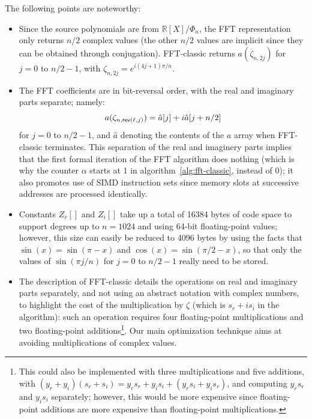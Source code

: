 \documentclass{llncs}
\newcommand{\bR}{\mathbb{R}}
\begin{document}
The following points are noteworthy:
\begin{itemize}

    \item Since the source polynomials are from $\bR[X]/\Phi_n$, the FFT
    representation only returns $n/2$ complex values (the other $n/2$
    values are implicit since they can be obtained through conjugation).
    \textsf{FFT-classic} returns $a(\zeta_{n,2j})$ for $j = 0$ to $n/2-1$,
    with $\zeta_{n,2j} = e^{i(4j+1)\pi/n}$.

    \item The FFT coefficients are in bit-reversal order, with the real
    and imaginary parts separate; namely:
    \begin{equation*}
        a(\zeta_{n,\text{\textsf{rev}}(\ell, j)})
            = {\hat a}[j] + i {\hat a}[j + n/2]
    \end{equation*}
    for $j = 0$ to $n/2 - 1$, and ${\hat a}$ denoting the contents of
    the $a$ array when \textsf{FFT-classic} terminates. This separation
    of the real and imaginery parts implies that the first formal
    iteration of the FFT algorithm does nothing (which is why the
    counter $\alpha$ starts at 1 in algorithm~\ref{alg:fft-classic},
    instead of 0); it also promotes use of SIMD instruction sets since
    memory slots at successive addresses are processed identically.

    \item Constants $Z_r[]$ and $Z_i[]$ take up a total of 16384 bytes
    of code space to support degrees up to $n = 1024$ and using 64-bit
    floating-point values; however, this size can easily be reduced to
    4096 bytes by using the facts that $\sin(x) = \sin(\pi - x)$ and
    $\cos(x) = \sin(\pi/2 - x)$, so that only the values of $\sin(\pi
    j/n)$ for $j = 0$ to $n/2 - 1$ really need to be stored.

    \item The description of \textsf{FFT-classic} details the operations
    on real and imaginary parts separately, and not using an abstract
    notation with complex numbers, to highlight the cost of the
    multiplication by $\zeta$ (which is $s_r + i s_i$ in the algorithm):
    such an operation requires four floating-point multiplications and
    two floating-point additions\footnote{This could also be implemented
    with three multiplications and five additions, with
    $(y_r + y_i)(s_r + s_i) = y_r s_r + y_i s_i + (y_r s_i + y_i s_r)$,
    and computing $y_r s_r$ and $y_i s_i$ separately; however, this would
    be more expensive since floating-point additions are more expensive
    than floating-point multiplications.}. Our main optimization technique
    aims at avoiding multiplications of complex values.

\end{itemize}
\end{document}

